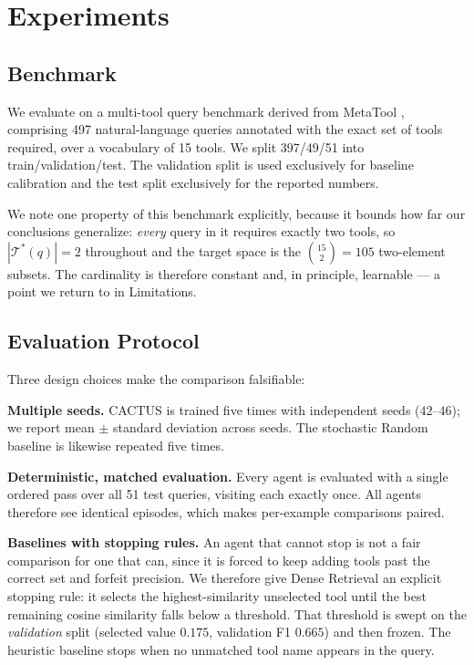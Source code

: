 \documentclass[11pt]{article}
\begin{document}
\section{Experiments}

\subsection{Benchmark}
We evaluate on a multi-tool query benchmark derived from MetaTool \cite{huang2024metatool}, comprising 497 natural-language queries annotated with the exact set of tools required, over a vocabulary of 15 tools. We split 397/49/51 into train/validation/test. The validation split is used exclusively for baseline calibration and the test split exclusively for the reported numbers.

We note one property of this benchmark explicitly, because it bounds how far our conclusions generalize: \emph{every} query in it requires exactly two tools, so $|\mathcal{T}^*(q)| = 2$ throughout and the target space is the $\binom{15}{2} = 105$ two-element subsets. The cardinality is therefore constant and, in principle, learnable --- a point we return to in Limitations.

\subsection{Evaluation Protocol}
\label{sec:protocol}
Three design choices make the comparison falsifiable:

\textbf{Multiple seeds.} CACTUS is trained five times with independent seeds ($42$--$46$); we report mean $\pm$ standard deviation across seeds. The stochastic Random baseline is likewise repeated five times.

\textbf{Deterministic, matched evaluation.} Every agent is evaluated with a single ordered pass over all 51 test queries, visiting each exactly once. All agents therefore see identical episodes, which makes per-example comparisons paired.

\textbf{Baselines with stopping rules.} An agent that cannot stop is not a fair comparison for one that can, since it is forced to keep adding tools past the correct set and forfeit precision. We therefore give Dense Retrieval an explicit stopping rule: it selects the highest-similarity unselected tool until the best remaining cosine similarity falls below a threshold. That threshold is swept on the \emph{validation} split (selected value $0.175$, validation F1 $0.665$) and then frozen. The heuristic baseline stops when no unmatched tool name appears in the query.
\end{document}
